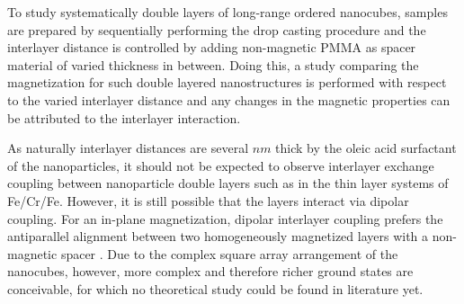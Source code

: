 \documentclass[\main/dresen_thesis.tex]{subfiles}
\begin{document}
  To study systematically double layers of long-range ordered nanocubes, samples are prepared by sequentially performing the drop casting procedure and the interlayer distance is controlled by adding non-magnetic PMMA as spacer material of varied thickness in between.
  Doing this, a study comparing the magnetization for such double layered nanostructures is performed with respect to the varied interlayer distance and any changes in the magnetic properties can be attributed to the interlayer interaction.

  As naturally interlayer distances are several $\unit{nm}$ thick by the oleic acid surfactant of the nanoparticles, it should not be expected to observe interlayer exchange coupling between nanoparticle double layers such as in the thin layer systems of Fe/Cr/Fe.
  However, it is still possible that the layers interact via dipolar coupling.
  For an in-plane magnetization, dipolar interlayer coupling prefers the antiparallel alignment between two homogeneously magnetized layers with a non-magnetic spacer \cite{Labrune_2002_Dipol}.
  Due to the complex square array arrangement of the nanocubes, however, more complex and therefore richer ground states are conceivable, for which no theoretical study could be found in literature yet.
\end{document}
